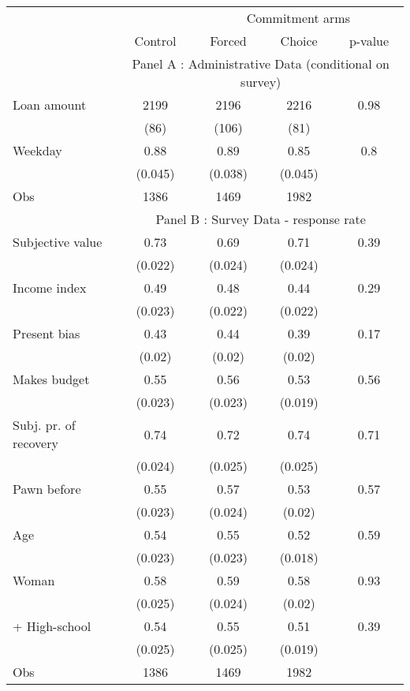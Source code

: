 \begin{tabular}{lcccc}
\toprule
      &       & \multicolumn{3}{c}{Commitment arms} \\
\cmidrule{3-5}      & \multicolumn{1}{p{4.545em}}{Control} & \multicolumn{1}{p{4.955em}}{Forced} & \multicolumn{1}{p{3.455em}}{Choice} & \multicolumn{1}{p{3.455em}}{p-value} \\
\midrule
      & \multicolumn{4}{c}{Panel A : Administrative Data (conditional on survey)} \\
\midrule
\midrule
Loan amount  & 2199  & 2196  & 2216  & 0.98 \\
      & (86)  & (106) & (81)  &  \\
Weekday & 0.88  & 0.89  & 0.85  & 0.8 \\
      & (0.045) & (0.038) & (0.045) &  \\
\midrule
Obs   & 1386  & 1469  & 1982  &  \\
\midrule
      & \multicolumn{4}{c}{Panel B : Survey Data - response rate} \\
\midrule
\midrule
Subjective value & 0.73  & 0.69  & 0.71  & 0.39 \\
      & (0.022) & (0.024) & (0.024) &  \\
Income index & 0.49  & 0.48  & 0.44  & 0.29 \\
      & (0.023) & (0.022) & (0.022) &  \\
Present bias & 0.43  & 0.44  & 0.39  & 0.17 \\
      & (0.02) & (0.02) & (0.02) &  \\
Makes budget & 0.55  & 0.56  & 0.53  & 0.56 \\
      & (0.023) & (0.023) & (0.019) &  \\
Subj. pr. of recovery & 0.74  & 0.72  & 0.74  & 0.71 \\
      & (0.024) & (0.025) & (0.025) &  \\
Pawn before & 0.55  & 0.57  & 0.53  & 0.57 \\
      & (0.023) & (0.024) & (0.02) &  \\
Age   & 0.54  & 0.55  & 0.52  & 0.59 \\
      & (0.023) & (0.023) & (0.018) &  \\
Woman & 0.58  & 0.59  & 0.58  & 0.93 \\
      & (0.025) & (0.024) & (0.02) &  \\
+ High-school & 0.54  & 0.55  & 0.51  & 0.39 \\
      & (0.025) & (0.025) & (0.019) &  \\
\midrule
Obs   & 1386  & 1469  & 1982  &  \\
\bottomrule
\bottomrule
\end{tabular}%
